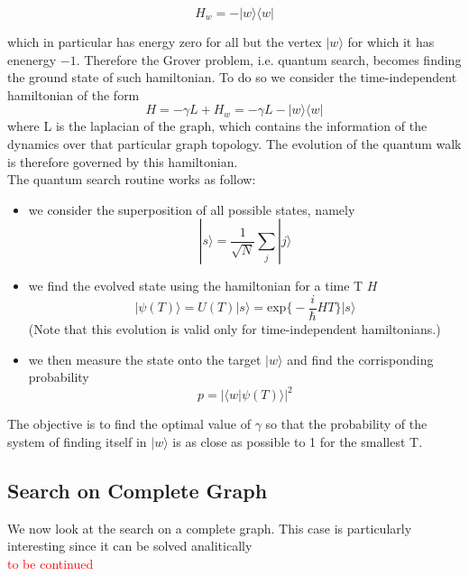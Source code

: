 \documentclass[11pt, twoside]{report}
\newcommand{\red}[1]{\textcolor{red}{#1}}
\begin{document}
\begin{equation}
  H_w = -|w\rangle\langle w|
\end{equation}

which in particular has energy zero for all but the vertex $|w\rangle$ for which it has enenergy $-1$. Therefore the Grover problem, i.e. quantum search, becomes finding the ground state of such hamiltonian. To do so we consider the time-independent hamiltonian of the form
\begin{equation}
  H = -\gamma L + H_w = -\gamma L -|w\rangle\langle w|
\end{equation}
where L is the laplacian of the graph, which contains the information of the dynamics over that particular graph topology. The evolution of the quantum walk is therefore governed by this hamiltonian.\\

The quantum search routine works as follow:
\begin{itemize}
  \item we consider the superposition of all possible states, namely
  \begin{equation}
    |s\rangle = \frac{1}{\sqrt{N}}\sum_j|j\rangle
  \end{equation}

  \item we find the evolved state using the hamiltonian for a time T $H$
  \begin{equation}
  |\psi(T)\rangle = U(T)|s\rangle  = \mbox{exp}\Big\{-\frac{i}{\hbar}HT\big\}|s\rangle
  \end{equation}
  (Note that this evolution is valid only for time-independent hamiltonians.)

  \item we then measure the state onto the target $|w\rangle$ and find the corrisponding probability
  \begin{equation}
    p = |\langle w|\psi(T)\rangle|^2
  \end{equation}

\end{itemize}

The objective is to find the optimal value of $\gamma$ so that the probability of the system of finding itself in $|w\rangle$ is as close as possible to 1 for the smallest T.

\subsection{Search on Complete Graph}
We now look at the search on a complete graph. This case is particularly interesting since it can be solved analitically\\
\red{to be continued}
\end{document}
